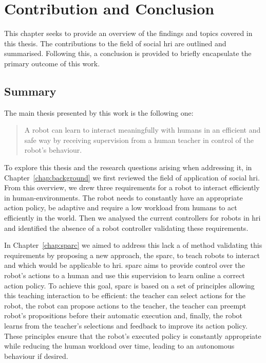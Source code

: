 \chapter{Contribution and Conclusion} \label{chap:conclusion}
\glsresetall
This chapter seeks to provide an overview of the findings and topics covered in this thesis. The contributions to the field of social \gls{hri} are outlined and summarised. Following this, a conclusion is provided to briefly encapsulate the primary outcome of this work.

\section{Summary}\label{sec:conc_summary}

The main thesis presented by this work is the following one: 
\begin{quote}
	A robot can learn to interact meaningfully with humans in an efficient and safe way by receiving supervision from a human teacher in control of the robot's behaviour. 
\end{quote}

To explore this thesis and the research questions arising when addressing it, in Chapter~\ref{chap:background} we first reviewed the field of application of social \gls{hri}. From this overview, we drew three requirements for a robot to interact efficiently in human-environments. The robot needs to constantly have an appropriate action policy, be adaptive and require a low workload from humans to act efficiently in the world. Then we analysed the current controllers for robots in \gls{hri} and identified the absence of a robot controller validating these requirements.

In Chapter~\ref{chap:sparc} we aimed to address this lack a of method validating this requirements by proposing a new approach, the \gls{sparc}, to teach robots to interact and which would be applicable to \gls{hri}. \gls{sparc} aims to provide control over the robot's actions to a human and use this supervision to learn online a correct action policy. To achieve this goal, \gls{sparc} is based on a set of principles allowing this teaching interaction to be efficient: the teacher can select actions for the robot, the robot can propose actions to the teacher, the teacher can preempt robot's propositions before their automatic execution and, finally, the robot learns from the teacher's selections and feedback to improve its action policy. These principles ensure that the robot's executed policy is constantly appropriate while reducing the human workload over time, leading to an autonomous behaviour if desired.

